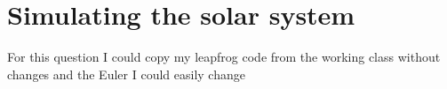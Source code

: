 \section{Simulating the solar system}

For this question I could copy my leapfrog code from the working class without changes and the Euler I could easily change 
